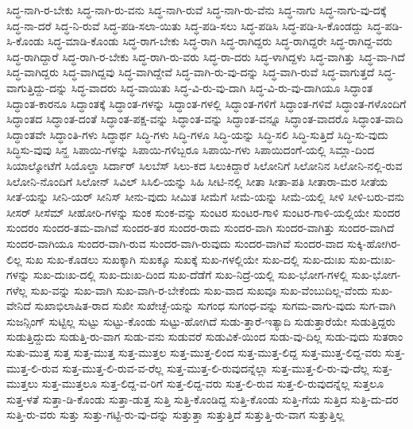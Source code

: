 {ಸಿದ್ಧ-ನಾಗಿ-ರ-ಬೇಕು
ಸಿದ್ಧ-ನಾಗಿ-ರು-ವನು
ಸಿದ್ಧ-ನಾಗಿ-ರುವೆ
ಸಿದ್ಧ-ನಾಗಿ-ರು-ವೆನು
ಸಿದ್ಧ-ನಾಗು
ಸಿದ್ಧ-ನಾಗು-ವು-ದಕ್ಕೆ
ಸಿದ್ಧ-ನಾ-ದರೆ
ಸಿದ್ಧ-ನಿ-ರುವೆ
ಸಿದ್ಧ-ಪಡಿ-ಸಲಾ-ಯಿತು
ಸಿದ್ಧ-ಪಡಿ-ಸಲು
ಸಿದ್ಧ-ಪಡಿಸಿ
ಸಿದ್ಧ-ಪಡಿ-ಸಿ-ಕೊಂಡದ್ದು
ಸಿದ್ಧ-ಪಡಿ-ಸಿ-ಕೊಂಡು
ಸಿದ್ಧ-ಮಾಡಿ-ಕೊಂಡು
ಸಿದ್ಧ-ರಾಗ-ಬೇಕು
ಸಿದ್ಧ-ರಾಗಿ
ಸಿದ್ಧ-ರಾಗಿದ್ದರು
ಸಿದ್ಧ-ರಾಗಿದ್ದರೇ
ಸಿದ್ಧ-ರಾಗಿದ್ದ-ವರು
ಸಿದ್ಧ-ರಾಗಿದ್ದಾರೆ
ಸಿದ್ಧ-ರಾಗಿ-ರ-ಬೇಕು
ಸಿದ್ಧ-ರಾಗಿ-ರು-ವರು
ಸಿದ್ಧ-ರಾ-ದರು
ಸಿದ್ಧ-ಳಾಗಿದ್ದಳು
ಸಿದ್ಧ-ವಾಗಿತ್ತು
ಸಿದ್ಧ-ವಾ-ಗಿದೆ
ಸಿದ್ಧ-ವಾಗಿದ್ದರು
ಸಿದ್ಧ-ವಾಗಿದ್ದವು
ಸಿದ್ಧ-ವಾಗಿದ್ದೇವೆ
ಸಿದ್ಧ-ವಾಗಿ-ರು-ವು-ದನ್ನು
ಸಿದ್ಧ-ವಾಗಿ-ರುವೆ
ಸಿದ್ಧ-ವಾಗುತ್ತದೆ
ಸಿದ್ಧ-ವಾಗುತ್ತಿದ್ದು-ದನ್ನು
ಸಿದ್ಧ-ವಾದರು
ಸಿದ್ಧ-ವಾಯಿತು
ಸಿದ್ಧ-ವಿ-ರು-ವು-ದಾಗಿ
ಸಿದ್ಧ-ವಿ-ರು-ವು-ದಾಗಿಯೂ
ಸಿದ್ಧಾಂತ
ಸಿದ್ಧಾಂತ-ಕಾರನೂ
ಸಿದ್ಧಾಂತಕ್ಕೆ
ಸಿದ್ಧಾಂತ-ಗಳನ್ನು
ಸಿದ್ಧಾಂತ-ಗಳಲ್ಲಿ
ಸಿದ್ಧಾಂತ-ಗಳಿಗೆ
ಸಿದ್ಧಾಂತ-ಗಳಿವೆ
ಸಿದ್ಧಾಂತ-ಗಳೊಂದಿಗೆ
ಸಿದ್ಧಾಂತದ
ಸಿದ್ಧಾಂತ-ದಂತೆ
ಸಿದ್ಧಾಂತ-ಪಕ್ಷ-ವನ್ನು
ಸಿದ್ಧಾಂತ-ವನ್ನು
ಸಿದ್ಧಾಂತ-ವನ್ನೂ
ಸಿದ್ಧಾಂತ-ವಾದರೊ
ಸಿದ್ಧಾಂತ-ವಾದಿ
ಸಿದ್ಧಾಂತವೇ
ಸಿದ್ಧಾಂತಿ-ಗಳು
ಸಿದ್ಧಾರ್ಥ
ಸಿದ್ಧಿ-ಗಳು
ಸಿದ್ಧಿ-ಗಳೂ
ಸಿದ್ಧಿ-ಯನ್ನು
ಸಿದ್ಧಿ-ಸಲಿ
ಸಿದ್ಧಿ-ಸುತ್ತಿದೆ
ಸಿದ್ಧಿ-ಸು-ವುದು
ಸಿದ್ಧಿಸು-ವುವು
ಸಿನ್ಹ
ಸಿಪಾಯಿ-ಗಳನ್ನು
ಸಿಪಾಯಿ-ಗಳಿಬ್ಬರೂ
ಸಿಪಾಯಿ-ಗಳು
ಸಿಪಾಯಿದಂಗೆ-ಯಲ್ಲಿ
ಸಿಮ್ಲಾ-ದಿಂದ
ಸಿಯಾಲ್ಕೋಟೆಗೆ
ಸಿಯೊಲ್ಡಾ
ಸಿರ್ದಾರ್
ಸಿಲಬೆಸ್
ಸಿಲು-ಕದ
ಸಿಲುಕಿದ್ದಾರೆ
ಸಿಲೋನಿಗೆ
ಸಿಲೋನಿನ
ಸಿಲೋನಿ-ನಲ್ಲಿ-ರುವ
ಸಿಲೋನಿ-ನೊಂದಿಗೆ
ಸಿಲೋನ್
ಸಿವಿಲ್
ಸಿಸಿಲಿ-ಯನ್ನು
ಸಿಹಿ
ಸೀಟಿ-ನಲ್ಲಿ
ಸೀತಾ
ಸೀತಾ-ಪತಿ
ಸೀತಾರಾ-ಮರ
ಸೀತೆಯ
ಸೀತೆ-ಯನ್ನು
ಸೀನಿ-ಯರ್
ಸೀನಿಸ್
ಸೀನು-ವುದು
ಸೀಮಿತ
ಸೀಮೆಗೆ
ಸೀಮೆ-ಯನ್ನು
ಸೀಮೆ-ಯಲ್ಲಿ
ಸೀಳಿ
ಸೀಳಿ-ಬರು-ವನು
ಸೀಸರ್
ಸೀಸೆಮ್
ಸೀಹೋರಿ-ಗಳನ್ನು
ಸುಂಕ
ಸುಂಕ-ವನ್ನು
ಸುಂಟರ
ಸುಂಟರ-ಗಾಳಿ
ಸುಂಟರ-ಗಾಳಿ-ಯಲ್ಲಿಯೇ
ಸುಂದರ
ಸುಂದರಂ
ಸುಂದರ-ತಮ-ವಾಗಿವೆ
ಸುಂದರ-ತರ
ಸುಂದರ-ರಾಮ
ಸುಂದರ-ವಾಗಿ
ಸುಂದರ-ವಾಗಿತ್ತು
ಸುಂದರ-ವಾಗಿದೆ
ಸುಂದರ-ವಾಗಿಯೂ
ಸುಂದರ-ವಾಗಿ-ರುವ
ಸುಂದರ-ವಾಗಿ-ರುವುದು
ಸುಂದರ-ವಾಗಿವೆ
ಸುಂದರ-ವಾದ
ಸುಕ್ಕಿ-ಹೋಗಿರ-ಲಿಲ್ಲ
ಸುಖ
ಸುಖ-ಕೊಡಲು
ಸುಖಕ್ಕಾಗಿ
ಸುಖಕ್ಕೂ
ಸುಖಕ್ಕೆ
ಸುಖ-ಗಳಲ್ಲಿಯೇ
ಸುಖ-ದಲ್ಲಿ
ಸುಖ-ದುಃಖ
ಸುಖ-ದುಃಖ-ಗಳನ್ನು
ಸುಖ-ದುಃಖ-ದಲ್ಲಿ
ಸುಖ-ದುಃಖ-ದಿಂದ
ಸುಖ-ದೆಡೆಗೆ
ಸುಖ-ನಿದ್ರೆ-ಯಲ್ಲಿ
ಸುಖ-ಭೋಗ-ಗಳಲ್ಲಿ
ಸುಖ-ಭೋಗ-ಗಳೆಲ್ಲ
ಸುಖ-ವನ್ನು
ಸುಖ-ವಾಗಿ
ಸುಖ-ವಾಗಿ-ರ-ಬೇಕೆಂದು
ಸುಖ-ವಾದ
ಸುಖವೂ
ಸುಖ-ವೆಂಬುದಿಲ್ಲ-ವೆಂದು
ಸುಖ-ವೇನಿದೆ
ಸುಖಾಭಿಲಾಷಿತ-ರಾದ
ಸುಖೀ
ಸುಖೇಚ್ಛೆ-ಯನ್ನು
ಸುಗಂಧ
ಸುಗಂಧ-ವನ್ನು
ಸುಗಮ-ವಾಗು-ವುದು
ಸುಗ-ವಾಗಿ
ಸುಜನ್ಸಿಂಗ್
ಸುಟ್ಟಿಲ್ಲ
ಸುಟ್ಟು
ಸುಟ್ಟು-ಕೊಂಡು
ಸುಟ್ಟು-ಹೋಗಿದೆ
ಸುಡು-ತ್ತಾರೆ-ಇತ್ಯಾದಿ
ಸುಡುತ್ತಾರೆಯೇ
ಸುಡುತ್ತಿದ್ದರು
ಸುಡುತ್ತಿದ್ದುದು
ಸುಡುತ್ತಿ-ರು-ವಾಗ
ಸುಡು-ವನು
ಸುಡುವರೆ
ಸುಡುವಿಕೆ-ಯಿಂದ
ಸುಡು-ವು-ದಿಲ್ಲ
ಸುಡು-ವುದು
ಸುತರಾಂ
ಸುತು-ಮುತ್ತ
ಸುತ್ತ
ಸುತ್ತ-ಮುತ್ತ
ಸುತ್ತ-ಮುತ್ತಲ
ಸುತ್ತ-ಮುತ್ತ-ಲಿಂದ
ಸುತ್ತ-ಮುತ್ತ-ಲಿದ್ದ
ಸುತ್ತ-ಮುತ್ತ-ಲಿದ್ದ-ವರು
ಸುತ್ತ-ಮುತ್ತ-ಲಿ-ರುವ
ಸುತ್ತ-ಮುತ್ತ-ಲಿ-ರುವ-ವ-ರೆಲ್ಲ
ಸುತ್ತ-ಮುತ್ತ-ಲಿ-ರುವುದನ್ನೆಲ್ಲಾ
ಸುತ್ತ-ಮುತ್ತ-ಲಿ-ರು-ವು-ದೆಲ್ಲ
ಸುತ್ತ-ಮುತ್ತಲು
ಸುತ್ತ-ಮುತ್ತಲೂ
ಸುತ್ತ-ಲಿದ್ದ-ವ-ರಿಗೆ
ಸುತ್ತ-ಲಿದ್ದ-ವರು
ಸುತ್ತ-ಲಿ-ರುವ
ಸುತ್ತ-ಲಿ-ರುವುದನ್ನೆಲ್ಲ
ಸುತ್ತಲೂ
ಸುತ್ತ-ಳತೆ
ಸುತ್ತಾ-ಡಿ-ಕೊಂಡು
ಸುತ್ತಾ-ಡುತ್ತ
ಸುತ್ತಿ
ಸುತ್ತಿ-ಕೊಂಡಿದ್ದ
ಸುತ್ತಿ-ಕೊಂಡು
ಸುತ್ತಿ-ಗೆಯ
ಸುತ್ತಿದ
ಸುತ್ತಿ-ದು-ದರ
ಸುತ್ತಿ-ರು-ವರು
ಸುತ್ತು
ಸುತ್ತು-ಗಟ್ಟಿ-ರು-ವು-ದನ್ನು
ಸುತ್ತುತ್ತಾ
ಸುತ್ತುತ್ತಿದೆ
ಸುತ್ತುತ್ತಿ-ರು-ವಾಗ
ಸುತ್ತುತ್ತಿಲ್ಲ
}
